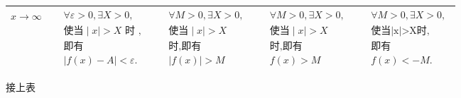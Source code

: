\documentclass[12pt, a4paper, oneside, UTF8]{ctexbook}  %
\begin{document}
\begin{table}[H]
\begin{tabular}{|l|l|l|l|l|}
        $x\to \infty$ & $\begin{aligned}&\forall\varepsilon>0,\exists X>0, \\&\text{使当}\mid x\mid>X\text{ 时 }, \\&\text{即有} \\&|f(x)-A|<\varepsilon.\end{aligned}$                  & $\begin{aligned}&\forall M>0,\exists X>0,\\& \text{使当}\mid x\mid>X \\&\text{时,即有}\\&|f(x)|>M\end{aligned}$                              & $\begin{aligned}&\forall M>0,\exists X>0, \\&\text{使当}\mid x\mid>X \\&\text{时,即有}\\& f(x)>M\end{aligned}$                    & $\begin{aligned}&\forall M>0,\exists X>0, \\&\text{使当|x|>X时,} \\&\text{即有} \\&f(x)<-M.\end{aligned}$                             \\ \hline
    \end{tabular}
\end{table}
\newpage
接上表
\end{document}
